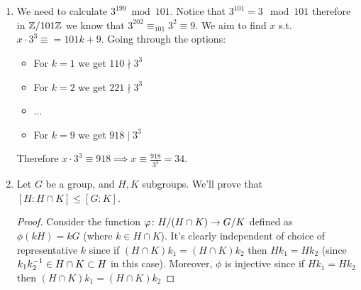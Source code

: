 \documentclass[a4paper]{article}
\begin{document}
	\section{}
	\begin{enumerate}
		\item We need to calculate $3^{199} \bmod 101$. Notice that $3^{101} = 3 \mod 101$ therefore in $\mathbb{Z}/101\mathbb{Z}$ we know that $3^{202} \equiv_{101} 3^{2} \equiv 9$. We aim to find $x$ s.t. $x \cdot 3^{3} \equiv = 101k + 9$. Going through the options: 
		\begin{itemize}
			\item For $k = 1$ we get $110 \nmid 3^{3}$
			\item For $k = 2$ we get $221 \nmid 3^{3}$
			\item ...
			\item For $k = 9$ we get $918 \mid 3^{3}$
		\end{itemize}
		Therefore $x \cdot 3^{3} \equiv 918 \implies x \equiv \frac{918}{3^{3}} = 34$. 
		\item Let $G$ be a group, and $H, K$ subgroups. We'll prove that $[H : H \cap K] \le [G : K]$. \begin{proof}
			Consider the function $\varphi \colon H/(H \cap K) \to G/K$ defined as $\phi(kH) = kG$ (where $k \in H \cap K$). It's clearly independent of choice of representative $k$ since if $(H \cap K)k_1 = (H \cap K)k_2$ then $Hk_1 = Hk_2$ (since $k_1 k_2^{-1} \in H \cap K \subset H$ in this case). Moreover, $\phi$ is injective since if $Hk_1 = Hk_2$ then $(H \cap K)k_1 = (H \cap K)k_2$
			

\end{proof}
\end{enumerate}
\end{document}
